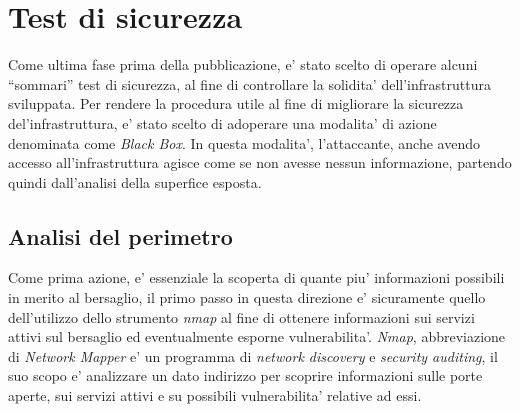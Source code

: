 \documentclass[a4paper]{report}
\newcommand{\quotes}[1]{``#1''}
\begin{document}
	\section{Test di sicurezza}\label{test_di_sicurezza}
		Come ultima fase prima della pubblicazione, e' stato scelto di operare alcuni \quotes{sommari} test di
		sicurezza, al fine di controllare la solidita' dell'infrastruttura sviluppata.
		Per rendere la procedura utile al fine di migliorare la sicurezza del'infrastruttura, e' stato scelto di
		adoperare una modalita' di azione denominata come \emph{Black Box}. In questa modalita', l'attaccante, anche
		avendo accesso all'infrastruttura agisce come se non avesse nessun informazione, partendo quindi dall'analisi
		della superfice esposta.
		\subsection{Analisi del perimetro}\label{analisi_del_perimetro}
			Come prima azione, e' essenziale la scoperta di quante piu' informazioni possibili in merito al bersaglio,
			il primo passo in questa direzione e' sicuramente quello dell'utilizzo dello strumento \emph{nmap} al fine
			di ottenere informazioni sui servizi attivi sul bersaglio ed eventualmente esporne vulnerabilita'.
			\emph{Nmap}\label{nmap}, abbreviazione di \emph{Network Mapper} e' un programma di \emph{network discovery}
			e \emph{security auditing}, il suo scopo e' analizzare un dato indirizzo per scoprire informazioni sulle
			porte aperte, sui servizi attivi e su possibili vulnerabilita' relative ad essi.
\end{document}
